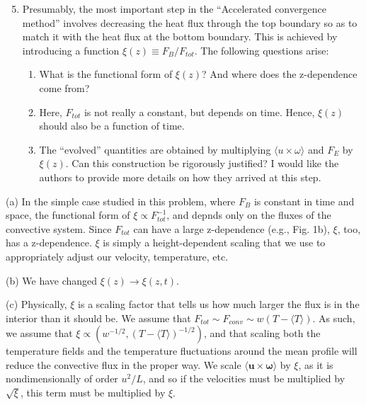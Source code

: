 \documentclass[aps, 11pt, singlecolumn]{revtex4-1} %
\begin{document}
\begin{singlespace}
\begin{myquotation}
$\,$\\\vspace{-1.25cm}
\begin{enumerate}
\setcounter{enumi}{4}
\item Presumably, the most important step in the “Accelerated convergence method” involves decreasing the heat flux through the top boundary so as to match it with the heat flux at the bottom boundary. This is achieved by introducing a function $\xi(z) \equiv  F_B/F_{tot}$. The following questions arise:
\begin{enumerate}
\item What is the functional form of $\xi(z)$? And where does the z-dependence come from?
\item Here, $F_{tot}$ is not really a constant, but depends on time. Hence, $\xi(z)$ should also be a function of time.
\item The ``evolved'' quantities are obtained by multiplying $\langle u \times \omega \rangle$ and $F_E$ by $\xi(z)$. Can this construction be rigorously justified? I would like the authors to provide more details on how they arrived at this step.
\end{enumerate}
\end{enumerate}
\end{myquotation}
(a) In the simple case studied in this problem, where $F_B$ is constant in time
and space, the functional form of $\xi \propto F_{tot}^{-1}$, and depnds only
on the fluxes of the convective system. Since $F_{tot}$ can
have a large z-dependence (e.g., Fig. 1b), $\xi$, too, has a z-dependence. 
$\xi$ is simply a height-dependent scaling that we use to appropriately
adjust our velocity, temperature, etc.

(b) We have changed $\xi(z) \rightarrow \xi(z, t)$.

(c) Physically, $\xi$ is a scaling factor that tells us how much larger the flux
is in the interior than it should be. 
We assume that $F_{tot} \sim F_{conv} \sim w (T - \langle T \rangle )$.
As such, we assume that $\xi \propto (w^{-1/2}, (T - \langle T \rangle )^{-1/2})$,
and that scaling both the temperature fields and the temperature fluctuations 
around the mean profile will reduce the convective flux in the proper way.
We scale $\langle \bm{u}\times\bm{\omega}\rangle$ by $\xi$, as it is
nondimensionally of order $u^2 / L$, and so if the velocities must be multiplied
by $\sqrt{\xi}$, this term must be multiplied by $\xi$.


\end{singlespace}
\end{document}
